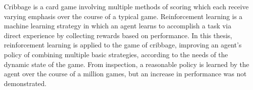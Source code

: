 

Cribbage is a card game involving multiple methods of scoring
which each receive varying emphasis
over the course of a typical game.
%
Reinforcement learning is a machine learning strategy in which an agent learns
to accomplish a task via direct experience
by collecting rewards based on performance.
%
In this thesis,
reinforcement learning is applied to the game of cribbage,
improving an agent's policy of combining multiple basic strategies,
according to the needs of the dynamic state of the game.
%
From inspection,
a reasonable policy is learned by the agent over the course of a million games,
but an increase in performance was not demonstrated.
